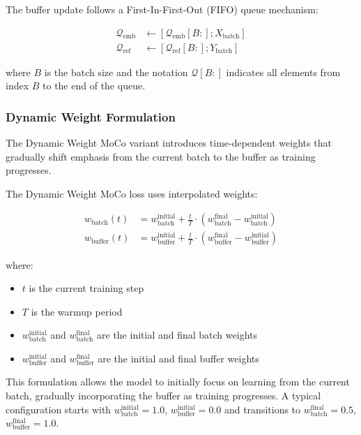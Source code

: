 The buffer update follows a First-In-First-Out (FIFO) queue mechanism:

\begin{align}
  \mathcal{Q}_{\text{emb}} &\leftarrow [\mathcal{Q}_{\text{emb}}[B:]; X_{\text{batch}}]\\
  \mathcal{Q}_{\text{ref}} &\leftarrow [\mathcal{Q}_{\text{ref}}[B:]; Y_{\text{batch}}]
\end{align}

where $B$ is the batch size and the notation $\mathcal{Q}[B:]$ indicates all elements from index $B$ to the end of the queue.

\subsubsection{Dynamic Weight Formulation}

The Dynamic Weight MoCo variant introduces time-dependent weights that gradually shift emphasis from the current batch to the buffer as training progresses.

\begin{equationbox}[title=Dynamic Weight MoCo Loss]
  The Dynamic Weight MoCo loss uses interpolated weights:

  \begin{align}
    w_{\text{batch}}(t) &= w_{\text{batch}}^{\text{initial}} + \frac{t}{T} \cdot (w_{\text{batch}}^{\text{final}} - w_{\text{batch}}^{\text{initial}})\\
    w_{\text{buffer}}(t) &= w_{\text{buffer}}^{\text{initial}} + \frac{t}{T} \cdot (w_{\text{buffer}}^{\text{final}} - w_{\text{buffer}}^{\text{initial}})
  \end{align}

  where:
  \begin{itemize}
  \item $t$ is the current training step
  \item $T$ is the warmup period
  \item $w_{\text{batch}}^{\text{initial}}$ and $w_{\text{batch}}^{\text{final}}$ are the initial and final batch weights
  \item $w_{\text{buffer}}^{\text{initial}}$ and $w_{\text{buffer}}^{\text{final}}$ are the initial and final buffer weights
  \end{itemize}
\end{equationbox}

This formulation allows the model to initially focus on learning from the current batch, gradually incorporating the buffer as training progresses. A typical configuration starts with $w_{\text{batch}}^{\text{initial}} = 1.0$, $w_{\text{buffer}}^{\text{initial}} = 0.0$ and transitions to $w_{\text{batch}}^{\text{final}} = 0.5$, $w_{\text{buffer}}^{\text{final}} = 1.0$.

